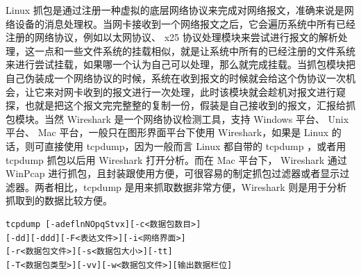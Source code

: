 Linux 抓包是通过注册一种虚拟的底层网络协议来完成对网络报文，准确来说是网络设备的消息处理权。当网卡接收到一个网络报文之后，它会遍历系统中所有已经注册的网络协议，例如以太网协议、 x25 协议处理模块来尝试进行报文的解析处理，这一点和一些文件系统的挂载相似，就是让系统中所有的已经注册的文件系统来进行尝试挂载，如果哪一个认为自己可以处理，那么就完成挂载。当抓包模块把自己伪装成一个网络协议的时候，系统在收到报文的时候就会给这个伪协议一次机会，让它来对网卡收到的报文进行一次处理，此时该模块就会趁机对报文进行窥探，也就是把这个报文完完整整的复制一份，假装是自己接收到的报文，汇报给抓包模块。当然 Wireshark 是一个网络协议检测工具，支持 Windows 平台、 Unix 平台、 Mac 平台，一般只在图形界面平台下使用 Wireshark，如果是 Linux 的话，则可直接使用 tcpdump，因为一般而言 Linux 都自带的 tcpdump ，或者用 tcpdump 抓包以后用 Wireshark 打开分析。而在 Mac 平台下， Wireshark 通过 WinPcap 进行抓包，且封装跟使用方便，可很容易的制定抓包过滤器或者显示过滤器。两者相比，tcpdump 是用来抓取数据非常方便，Wireshark 则是用于分析抓取到的数据比较方便。



\begin{Verbatim}
tcpdump [-adeflnNOpqStvx][-c<数据包数目>]
[-dd][-ddd][-F<表达文件>][-i<网络界面>]
[-r<数据包文件>][-s<数据包大小>][-tt]
[-T<数据包类型>][-vv][-w<数据包文件>][输出数据栏位]
\end{Verbatim}

